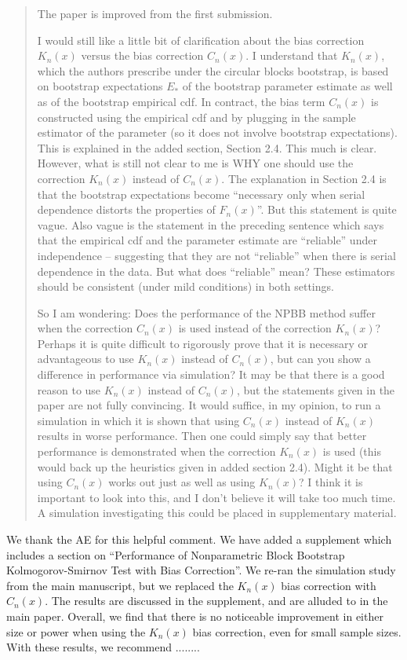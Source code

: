 \documentclass[12pt]{article}
\newenvironment{comment}%
{\begin{quotation}\noindent\small\it\color{darkblue}\ignorespaces%
}{\end{quotation}}
\begin{document}
\begin{comment}
The paper is improved from the first submission.


I would still like a little bit of clarification about the bias
correction $K_n(x)$ versus the bias correction $C_n(x)$. I understand
that $K_n(x)$, which the authors prescribe under the circular blocks
bootstrap, is based on bootstrap expectations $E_*$ of the bootstrap
parameter estimate as well as of the bootstrap empirical cdf. In
contract, the bias term $C_n(x)$ is constructed using the empirical
cdf and by plugging in the sample estimator of the parameter (so it
does not involve bootstrap expectations).  This is explained in the
added section, Section 2.4.  This much is clear. However, what is
still not clear to me is WHY one should use the correction $K_n(x)$
instead of $C_n(x)$. The explanation in Section 2.4 is that the
bootstrap expectations become ``necessary only when serial dependence
distorts the properties of $F_n(x)$''.  But this statement is quite
vague.  Also vague is the statement in the preceding sentence which
says that the empirical cdf and the parameter estimate are ``reliable''
under independence -- suggesting that they are not ``reliable'' when
there is serial dependence in the data.  But what does ``reliable''
mean? These estimators should be consistent (under mild conditions) in
both settings.


So I am wondering: Does the performance of the NPBB method suffer when
the correction $C_n(x)$ is used instead of the correction $K_n(x)$?
Perhaps it is quite difficult to rigorously prove that it is necessary
or advantageous to use $K_n(x)$ instead of $C_n(x)$, but can you show
a difference in performance via simulation?  It may be that there is a
good reason to use $K_n(x)$ instead of $C_n(x)$, but the statements
given in the paper are not fully convincing.   It would suffice, in my
opinion, to run a simulation in which it is shown that using $C_n(x)$
instead of $K_n(x)$ results in worse performance.  Then one could
simply say that better performance is demonstrated when the correction
$K_n(x)$ is used (this would back up the heuristics given in added
section 2.4). Might it be that using $C_n(x)$ works out just as well
as using $K_n(x)$?  I think it is important to look into this, and I
don't believe it will take too much time. A simulation investigating
this could be placed in supplementary material.
\end{comment}

We thank the AE for this helpful comment. We have added a supplement
which includes a section on ``Performance of Nonparametric
Block Bootstrap Kolmogorov-Smirnov Test with \citet{babu2004goodness}
Bias Correction''. We re-ran the simulation study from the main
manuscript, but we replaced the $K_n(x)$ bias correction with $C_n(x)$.
The results are discussed in the supplement, and are alluded to in the
main paper. Overall, we find that there is no noticeable improvement
in either size or power when using the $K_n(x)$ bias correction, even
for small sample sizes. With these results, we recommend ........
\end{document}

